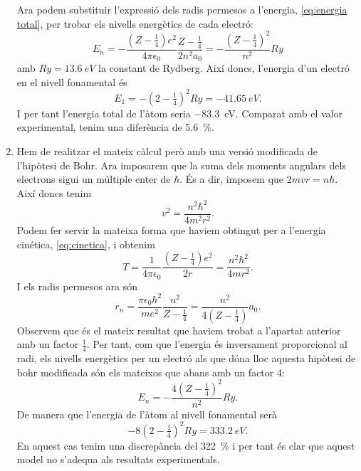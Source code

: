\documentclass[12pt]{article}
\numberwithin{table}{section}
\numberwithin{figure}{section}
\numberwithin{equation}{section}
\newcommand{\Ry}{\mathit{Ry}}
\begin{document}
\begin{enumerate}[label=(\alph*), font=\bfseries \sffamily, wide, labelwidth=!, labelindent=0pt]
		Ara podem substituir l'expressió dels radis permesos a l'energia, \cref{eq:energia total}, per trobar els nivells energètics de cada electró:
		\begin{equation*}
			E_n = -\frac{(Z - \tfrac{1}{4})e^2}{4\pi\epsilon_0}\frac{Z - \tfrac{1}{4}}{2n^2a_0} = - \frac{(Z - \frac{1}{4})^2}{n^2} \Ry
		\end{equation*}
		amb \( \Ry = \SI{13.6}{eV} \) la constant de Rydberg. Així doncs, l'energia d'un electró en el nivell fonamental és
		\begin{equation*}
			E_1 = -(2 - \tfrac{1}{4})^2 Ry = -\SI{41.65}{eV}. 
		\end{equation*}
		I per tant l'energia total de l'àtom seria \SI{-83.3}{eV}. Comparat amb el valor experimental, tenim una diferència de \SI{5.6}{\percent}.

	\item Hem de realitzar el mateix càlcul però amb una versió modificada de l'hipòtesi de Bohr. Ara imposarem que la suma dels moments angulars dels electrons sigui un múltiple enter de \( \hbar \). És a dir, imposem que \( 2mvr = n\hbar \). Així doncs tenim
		\begin{equation*}
			v^2 = \frac{n^2 \hbar^2}{4m^2r^2}. 
		\end{equation*}
		Podem fer servir la mateixa forma que haviem obtingut per a l'energia cinética, \cref{eq:cinetica}, i obtenim
		\begin{equation*}
			T = \frac{1}{4\pi\epsilon_0} \frac{(Z - \frac{1}{4})e^2}{2r} = \frac{n^2 \hbar^2}{4mr^2}.
		\end{equation*}
		I els radis permesos ara són
		\begin{equation*}
			r_n = \frac{\pi\epsilon_0\hbar^2}{me^2}\frac{n^2}{Z-\frac{1}{4}} = \frac{n^2}{4(Z - \frac{1}{4})}a_0.
		\end{equation*}
		Observem que és el mateix resultat que haviem trobat a l'apartat anterior amb un factor \( \frac{1}{4} \). Per tant, com que l'energia és inversament proporcional al radi, els nivells energètics per un electró als que dóna lloc aquesta hipòtesi de bohr modificada són els mateixos que abans amb un factor 4:
		\begin{equation*}
			E_n = -\frac{4(Z - \frac{1}{4})^2}{n^2}\Ry.
		\end{equation*}
		De manera que l'energia de l'àtom al nivell fonamental serà
		\begin{equation*}
			-8(2 - \tfrac{1}{4})^2 \Ry = \SI{333,2}{eV}.
		\end{equation*}
En aquest cas tenim una discrepància del \SI{322}{\percent} i per tant és clar que aquest model no s'adequa als resultats experimentals.

\end{enumerate}
\end{document}
